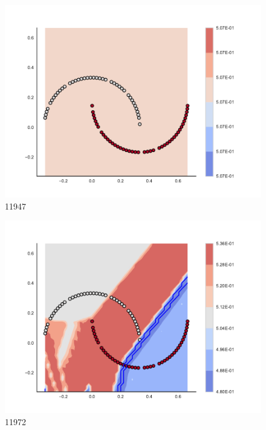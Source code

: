\begin{subfigure}[b]{0.09\textwidth}
    \includegraphics[clip, trim=2.35cm 1.75cm 4.5cm 0cm,width=\textwidth]{img/convergence/11947.pdf}
    \caption{11947}
    \label{fig:convergence_11947}
\end{subfigure}
%
\begin{subfigure}[b]{0.09\textwidth}
    \includegraphics[clip, trim=2.35cm 1.75cm 4.5cm 0cm,width=\textwidth]{img/convergence/11972.pdf}
    \caption{11972}
    \label{fig:convergence_11972}
\end{subfigure}
%
